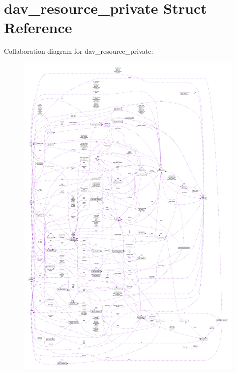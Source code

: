 \hypertarget{structdav__resource__private}{}\section{dav\+\_\+resource\+\_\+private Struct Reference}
\label{structdav__resource__private}


Collaboration diagram for dav\+\_\+resource\+\_\+private\+:
\nopagebreak
\begin{figure}[H]
\begin{center}
\leavevmode
\includegraphics[width=350pt]{structdav__resource__private__coll__graph}
\end{center}
\end{figure}
